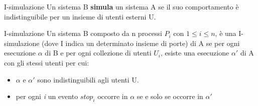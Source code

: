\documentclass{beamer}
\begin{document}
    \begin{frame}{I-simulazione}
        Un sistema B \textbf{simula} un sistema A se il suo comportamento è indistinguibile per un insieme di utenti esterni U.

        \begin{block}{I-simulazione}
            Un sistema B composto da n processi $P_{i}$ con $1 \leq i \leq n$, è una I-simulazione (dove I indica un determinato insieme di porte) di A se per ogni esecuzione $\alpha$ di B e per ogni collezione di utenti $U_{i}$, esiste una esecuzione $\alpha'$ di A con gli stessi utenti per cui:
            \begin{itemize}
                \item $\alpha$ e $\alpha'$ sono indistinguibili agli utenti U. %
                \item per ogni \textit{i} un evento $stop_{i}$ occorre in $\alpha$ se e solo se occorre in $\alpha'$
            \end{itemize}
        \end{block}

    \end{frame}
\end{document}
